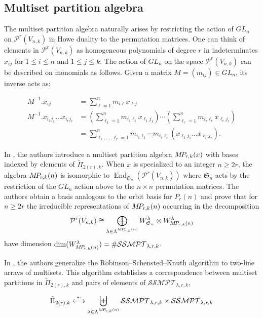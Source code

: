 \documentclass[10pt]{amsart}
\theoremstyle{definition}
\theoremstyle{definition}
\theoremstyle{plain}
\theoremstyle{remark}
\theoremstyle{plain}
\theoremstyle{plain}
\newcommand{\PP}{\mathcal{P}}
\newcommand{\SG}{\mathfrak{S}}
\newcommand{\MP}{{\rm M\!P\!}}
\newcommand{\SSMPT}{\mathcal{SSMPT}}
\DeclareMathOperator{\End}{End}
\begin{document}
\subsection{Multiset partition algebra}

The multiset partition algebra naturally arises by restricting the action of $GL_n$ on $\PP^r(V_{n,k})$ in Howe duality to the permutation matrices. One can think of elements in $\PP^r(V_{n,k})$ as homogeneous polynomials of degree $r$ in indeterminates $x_{ij}$ for $1\leq i\leq n$ and $1\leq j\leq k$. The action of $GL_n$ on the space $\PP^r(V_{n,k})$ can be described on monomials as follows. Given a matrix $M=(m_{ij})\in GL_n$, its inverse acts as:

\begin{align}
    M^{-1}.x_{ij}&=\sum_{\ell=1}^n m_{i\ell}x_{\ell j}\nonumber\\
    M^{-1}.x_{i_1j_1}\dots x_{i_rj_r}&=\left(\sum_{\ell_1=1}^n m_{i_1\ell_1}x_{\ell_1 j_1}\right)\cdots\left(\sum_{\ell_r=1}^n m_{i_r\ell_r}x_{\ell_r j_r}\right)\nonumber\\
    &=\sum_{\ell_1,\dots,\ell_r=1}^n m_{i_1\ell_1}\cdots m_{i_r\ell_r} (x_{\ell_1j_1}\dots x_{\ell_rj_r}).\label{eq:Ua_computation}
\end{align}

In \cite{orellana2020howe}, the authors introduce a multiset partition algebra $\MP_{r,k}(x)$ with bases indexed by elements of $\tilde\Pi_{2(r),k}$. When $x$ is specialized to an integer $n\geq 2r$, the algebra $\MP_{r,k}(n)$ is isomorphic to $\End_{\SG_n}(\PP^r(V_{n,k}))$ where $\SG_n$ acts by the restriction of the $GL_n$ action above to the $n\times n$ permutation matrices. The authors obtain a basis analogous to the orbit basis for $P_r(n)$ and prove that for $n\geq 2r$ the irreducible representations of $\MP_{r,k}(n)$ occurring in the decomposition \begin{align}
    \PP^r(V_{n,k})\cong\bigoplus_{\lambda\in\Lambda^{\MP_{r,k}(n)}}W_{\SG_n}^\lambda\otimes W_{\MP_{r,k}(n)}^\lambda \label{eq:mprk_decomp}
\end{align} have dimension $\dim(W_{\MP_{r,k}(n)}^\lambda)=\#\SSMPT_{\lambda,r,k}$.

In \cite{MR4090833}, the authors generalize the Robinson–Schensted–Knuth algorithm to two-line arrays of multisets. This algorithm establishes a correspondence between multiset partitions in $\tilde\Pi_{2(r),k}$ and pairs of elements of $\SSMPT_{\lambda,r,k}$, 

\[\tilde\Pi_{2(r),k}\stackrel{\sim}{\longleftrightarrow}\biguplus_{\lambda\in\Lambda^{\MP_{r,k}(n)}}\SSMPT_{\lambda,r,k}\times \SSMPT_{\lambda,r,k}\]
\end{document}
